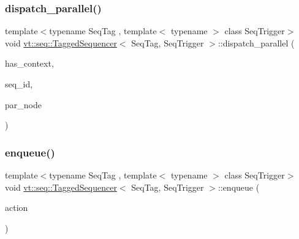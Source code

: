 \subsubsection{\texorpdfstring{dispatch\+\_\+parallel()}{dispatch\_parallel()}}
{\footnotesize\ttfamily template$<$typename Seq\+Tag , template$<$ typename $>$ class Seq\+Trigger$>$ \\
void \hyperlink{structvt_1_1seq_1_1_tagged_sequencer}{vt\+::seq\+::\+Tagged\+Sequencer}$<$ Seq\+Tag, Seq\+Trigger $>$\+::dispatch\+\_\+parallel (\begin{DoxyParamCaption}\item[{bool const \&}]{has\+\_\+context,  }\item[{\hyperlink{structvt_1_1seq_1_1_tagged_sequencer_a1c8ee839258d0f88c49ef660267a81d5}{Seq\+Type} const \&}]{seq\+\_\+id,  }\item[{\hyperlink{namespacevt_1_1seq_ae6a4874b585be0612aaca32ca6d2d191}{Seq\+Node\+Ptr\+Type}}]{par\+\_\+node }\end{DoxyParamCaption})}

\mbox{\label{structvt_1_1seq_1_1_tagged_sequencer_a6c8c19a264be5d59d0abdbc31c8d6df8}} 
\subsubsection{\texorpdfstring{enqueue()}{enqueue()}}
{\footnotesize\ttfamily template$<$typename Seq\+Tag , template$<$ typename $>$ class Seq\+Trigger$>$ \\
void \hyperlink{structvt_1_1seq_1_1_tagged_sequencer}{vt\+::seq\+::\+Tagged\+Sequencer}$<$ Seq\+Tag, Seq\+Trigger $>$\+::enqueue (\begin{DoxyParamCaption}\item[{\hyperlink{namespacevt_ae0a5a7b18cc99d7b732cb4d44f46b0f3}{Action\+Type} const \&}]{action }\end{DoxyParamCaption})}

\mbox{\label{structvt_1_1seq_1_1_tagged_sequencer_a19fff2edf483162cfe8af618d5d8ff32}} 
